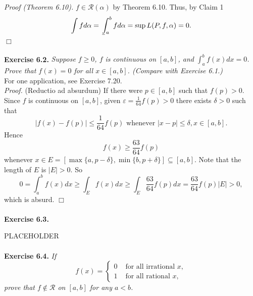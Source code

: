 \documentclass{article}
\def\lowint{\mkern3mu\underline{\vphantom{\intop}\mkern7mu}\mkern-10mu\int}
\begin{document}
\emph{Proof (Theorem 6.10).}
$f \in \mathscr{R}(\alpha)$ by Theorem 6.10.
Thus, by Claim 1
$$\int f d \alpha = \lowint_a^b f d\alpha = \sup L(P, f, \alpha) = 0.$$
$\Box$ \\\\






\textbf{Exercise 6.2.}
\emph{Suppose $f \geq 0$,
$f$ is continuous on $[a,b]$, and $\int_{a}^{b} f(x) dx = 0$.
Prove that $f(x) = 0$ for all $x \in [a,b]$.
(Compare with Exercise 6.1.)} \\

For one application, see Exercise 7.20. \\

\emph{Proof.}
(Reductio ad absurdum)
If there were $p \in [a,b]$ such that $f(p) > 0$.
Since $f$ is continuous on $[a,b]$, given $\varepsilon = \frac{1}{64}f(p) > 0$
there exists $\delta > 0$
such that
\[
  |f(x) - f(p)| \leq \frac{1}{64}f(p) \text{ whenever } |x-p| \leq \delta, x \in [a,b].
\]
Hence
\[
  f(x) \geq \frac{63}{64}f(p)
\]
whenever $x \in E = [\max\{a,p-\delta\}, \min\{b,p+\delta\}] \subseteq [a,b]$.
Note that the length of $E$ is $|E| > 0$.
So
\[
  0
  = \int_{a}^{b} f(x) dx
  \geq \int_{E} f(x) dx
  \geq \int_{E} \frac{63}{64}f(p) dx
  = \frac{63}{64}f(p)|E| > 0,
\]
which is absurd.
$\Box$ \\\\






\textbf{Exercise 6.3.}

PLACEHOLDER \\\\






\textbf{Exercise 6.4.}
\emph{If
\begin{equation*}
  f(x) =
    \begin{cases}
      0 & \text{ for all irrational $x$}, \\
      1 & \text{ for all rational $x$},
    \end{cases}
\end{equation*}
prove that $f \not\in \mathscr{R}$ on $[a,b]$ for any $a < b$.} \\
\end{document}
